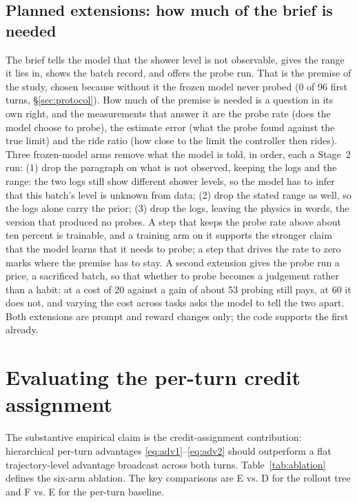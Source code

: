 \documentclass[11pt,a4paper]{article}
\begin{document}
\subsection{Planned extensions: how much of the brief is needed}
\label{sec:plan-extensions}
The brief tells the model that the shower level is not observable, gives the range it lies in, shows the batch record, and offers the probe run. That is the premise of the study, chosen because without it the frozen model never probed (0 of 96 first turns, \S\ref{sec:protocol}). How much of the premise is needed is a question in its own right, and the measurements that answer it are the probe rate (does the model choose to probe), the estimate error (what the probe found against the true limit) and the ride ratio (how close to the limit the controller then rides). Three frozen-model arms remove what the model is told, in order, each a Stage~2 run: (1) drop the paragraph on what is not observed, keeping the logs and the range: the two logs still show different shower levels, so the model has to infer that this batch's level is unknown from data; (2) drop the stated range as well, so the logs alone carry the prior; (3) drop the logs, leaving the physics in words, the version that produced no probes. A step that keeps the probe rate above about ten percent is trainable, and a training arm on it supports the stronger claim that the model learns that it needs to probe; a step that drives the rate to zero marks where the premise has to stay. A second extension gives the probe run a price, a sacrificed batch, so that whether to probe becomes a judgement rather than a habit: at a cost of 20 against a gain of about 53 probing still pays, at 60 it does not, and varying the cost across tasks asks the model to tell the two apart. Both extensions are prompt and reward changes only; the code supports the first already.

\section{Evaluating the per-turn credit assignment}
\label{sec:eval}

The substantive empirical claim is the credit-assignment contribution: hierarchical per-turn advantages \eqref{eq:adv1}--\eqref{eq:adv2} should outperform a flat trajectory-level advantage broadcast across both turns. Table~\ref{tab:ablation} defines the six-arm ablation. The key comparisons are E vs. D for the rollout tree and F vs. E for the per-turn baseline.
\end{document}
